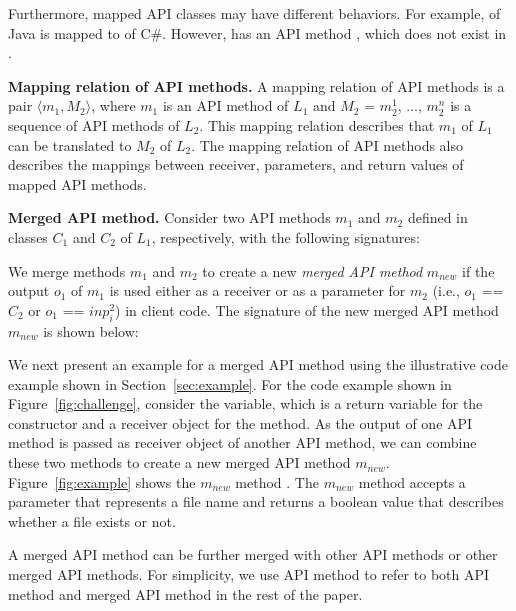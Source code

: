 Furthermore, mapped API classes may have different behaviors. For
example,  of Java is mapped to
 of C\#. However,  has
an API method , which does not exist in
.

\textbf{Mapping relation of API methods.} A mapping relation of
API methods is a pair $\langle m_1, M_2 \rangle$, where $m_1$
is an API method of $L_1$ and $M_2$ = $m_2^1$, $\dots$, $m_2^n$
is a sequence of API methods of $L_2$. 
This mapping relation describes that $m_1$ of $L_1$ can be translated
to $M_2$ of $L_2$. The mapping relation of API methods also
describes the mappings between receiver, parameters, and return values of mapped
API methods. 

\textbf{Merged API method.} Consider two API methods $m_1$ and $m_2$ defined
in classes $C_1$ and $C_2$ of $L_1$, respectively, with the
following signatures:



We merge methods $m_1$ and $m_2$ to create a new \emph{merged API method} $m_{new}$ if the
output $o_1$ of $m_1$ is used either as a receiver or as a
parameter for $m_2$ (i.e., $o_1$ == $C_2$ or $o_1$ == $inp_i^2$)
in client code. The signature of the new merged API method $m_{new}$ is
shown below:


We next present an example for a merged API method using the
illustrative code example shown in Section~\ref{sec:example}. For
the code example shown in Figure~\ref{fig:challenge}, consider the
 variable, which is a return variable for the
constructor and a receiver object for the  method. As
the output of one API method is passed as receiver object of another
API method, we can combine these two methods to create a new merged
API method $m_{new}$. Figure~\ref{fig:example} shows the $m_{new}$
method . The $m_{new}$ method
accepts a  parameter that represents a file name and
returns a boolean value that describes whether a file exists or not.

A merged API method can be further merged with other API methods or
other merged API methods. For simplicity, we use API method to refer
to both API method and merged API method in the rest of the paper.

